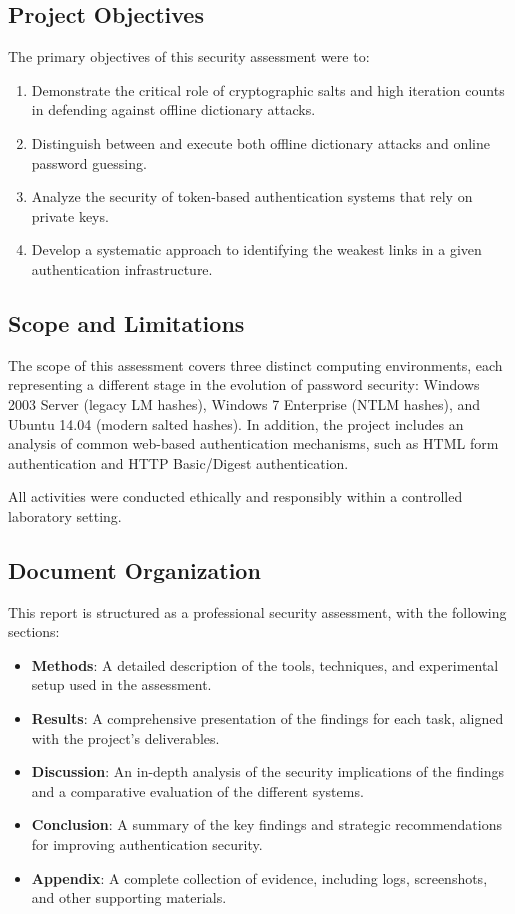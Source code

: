 \subsection{Project Objectives}

The primary objectives of this security assessment were to:

\begin{enumerate}
    \item Demonstrate the critical role of cryptographic salts and high iteration counts in defending against offline dictionary attacks.
    \item Distinguish between and execute both offline dictionary attacks and online password guessing.
    \item Analyze the security of token-based authentication systems that rely on private keys.
    \item Develop a systematic approach to identifying the weakest links in a given authentication infrastructure.
\end{enumerate}

\subsection{Scope and Limitations}

The scope of this assessment covers three distinct computing environments, each representing a different stage in the evolution of password security: Windows 2003 Server (legacy LM hashes), Windows 7 Enterprise (NTLM hashes), and Ubuntu 14.04 (modern salted hashes). In addition, the project includes an analysis of common web-based authentication mechanisms, such as HTML form authentication and HTTP Basic/Digest authentication.

All activities were conducted ethically and responsibly within a controlled laboratory setting.

\subsection{Document Organization}

This report is structured as a professional security assessment, with the following sections:

\begin{itemize}
    \item \textbf{Methods}: A detailed description of the tools, techniques, and experimental setup used in the assessment.
    \item \textbf{Results}: A comprehensive presentation of the findings for each task, aligned with the project's deliverables.
    \item \textbf{Discussion}: An in-depth analysis of the security implications of the findings and a comparative evaluation of the different systems.
    \item \textbf{Conclusion}: A summary of the key findings and strategic recommendations for improving authentication security.
    \item \textbf{Appendix}: A complete collection of evidence, including logs, screenshots, and other supporting materials.
\end{itemize}